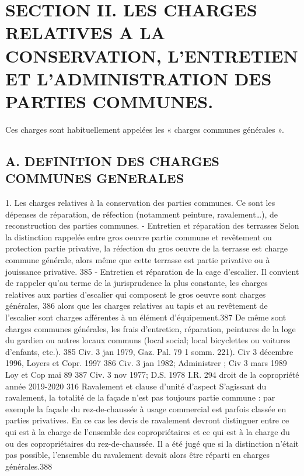 \section{SECTION II. LES CHARGES RELATIVES A LA CONSERVATION, L'ENTRETIEN ET L'ADMINISTRATION DES PARTIES COMMUNES.}
	
	Ces charges sont habituellement appelées les « charges communes générales ».
	
	\subsection{A. DEFINITION DES CHARGES COMMUNES GENERALES}
	
		1. Les charges relatives à la conservation des parties communes.
		Ce sont les dépenses de réparation, de réfection (notamment peinture, ravalement…), de reconstruction des parties communes.
		- Entretien et réparation des terrasses
		Selon la distinction rappelée entre gros oeuvre partie commune et revêtement ou protection partie privative, la réfection du gros oeuvre de la terrasse est charge commune générale, alors même que cette terrasse est partie privative ou à jouissance privative. 385
		- Entretien et réparation de la cage d'escalier.
		Il convient de rappeler qu'au terme de la jurisprudence la plus constante, les charges relatives aux parties d'escalier qui composent le gros oeuvre sont charges générales, 386 alors que les charges relatives au tapis et au revêtement de l'escalier sont charges afférentes à un élément d'équipement.387
		De même sont charges communes générales, les frais d'entretien, réparation, peintures de la loge du gardien ou autres locaux communs (local social; local bicyclettes ou voitures d’enfants, etc.).
		385 Civ. 3 jan 1979, Gaz. Pal. 79 1 somm. 221). Civ 3 décembre 1996, Loyers et Copr. 1997 
		386 Civ. 3 jan 1982; Administrer ; Civ 3 mars 1989 Loy et Cop mai 89 
		387 Civ. 3 nov 1977; D.S. 1978 I.R. 294
		droit de la copropriété année 2019-2020
		316
		Ravalement et clause d’unité d’aspect
		S'agissant du ravalement, la totalité de la façade n'est pas toujours partie commune : par exemple la façade du rez-de-chaussée à usage commercial est parfois classée en parties privatives. En ce cas les devis de ravalement devront distinguer entre ce qui est à la charge de l'ensemble des copropriétaires et ce qui est à la charge du ou des copropriétaires du rez-de-chaussée. Il a été jugé que si la distinction n'était pas possible, l'ensemble du ravalement devait alors être réparti en charges générales.388
